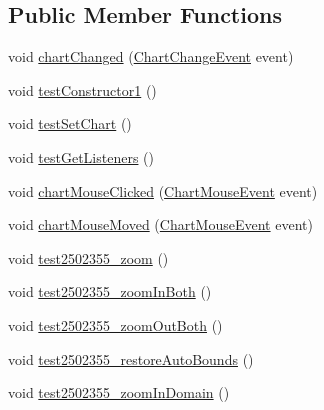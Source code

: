 \subsection*{Public Member Functions}
\begin{DoxyCompactItemize}
\item 
void \mbox{\hyperlink{classorg_1_1jfree_1_1chart_1_1_chart_panel_test_a2adbf5693b2052053d2737583c146f4d}{chart\+Changed}} (\mbox{\hyperlink{classorg_1_1jfree_1_1chart_1_1event_1_1_chart_change_event}{Chart\+Change\+Event}} event)
\item 
void \mbox{\hyperlink{classorg_1_1jfree_1_1chart_1_1_chart_panel_test_abdec9bbaeb77e23074ac456908e9c7aa}{test\+Constructor1}} ()
\item 
void \mbox{\hyperlink{classorg_1_1jfree_1_1chart_1_1_chart_panel_test_a3fcc257016e07e2f928581937ac04130}{test\+Set\+Chart}} ()
\item 
void \mbox{\hyperlink{classorg_1_1jfree_1_1chart_1_1_chart_panel_test_ab05c479ee5666adce320de8ffd080bc0}{test\+Get\+Listeners}} ()
\item 
void \mbox{\hyperlink{classorg_1_1jfree_1_1chart_1_1_chart_panel_test_a8c56580e9af6f212e2b587673913be07}{chart\+Mouse\+Clicked}} (\mbox{\hyperlink{classorg_1_1jfree_1_1chart_1_1_chart_mouse_event}{Chart\+Mouse\+Event}} event)
\item 
void \mbox{\hyperlink{classorg_1_1jfree_1_1chart_1_1_chart_panel_test_af9a45698f4c232b2b9ff6fe9dd450c79}{chart\+Mouse\+Moved}} (\mbox{\hyperlink{classorg_1_1jfree_1_1chart_1_1_chart_mouse_event}{Chart\+Mouse\+Event}} event)
\item 
void \mbox{\hyperlink{classorg_1_1jfree_1_1chart_1_1_chart_panel_test_a26156f029f2f350b7df7e12e8a63d271}{test2502355\+\_\+zoom}} ()
\item 
void \mbox{\hyperlink{classorg_1_1jfree_1_1chart_1_1_chart_panel_test_a6ee602b8264fe41a9862a8e3cdbbfd9a}{test2502355\+\_\+zoom\+In\+Both}} ()
\item 
void \mbox{\hyperlink{classorg_1_1jfree_1_1chart_1_1_chart_panel_test_af18b31659da9ed00a490c8d713926b9d}{test2502355\+\_\+zoom\+Out\+Both}} ()
\item 
void \mbox{\hyperlink{classorg_1_1jfree_1_1chart_1_1_chart_panel_test_ae86c70691776fe374c1a3b580df79357}{test2502355\+\_\+restore\+Auto\+Bounds}} ()
\item 
void \mbox{\hyperlink{classorg_1_1jfree_1_1chart_1_1_chart_panel_test_a0551d4f213a60140f9886ae2dccdf848}{test2502355\+\_\+zoom\+In\+Domain}} ()
\item 

\end{DoxyCompactItemize}
